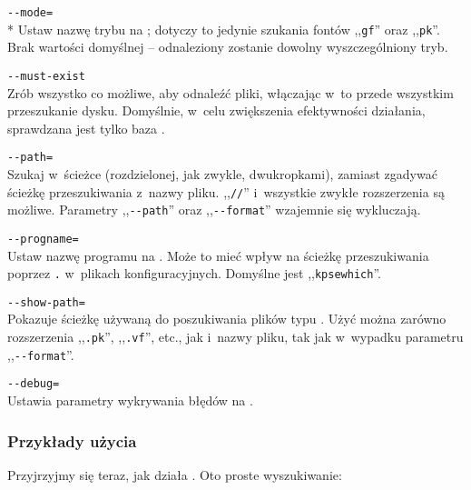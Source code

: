 \documentclass{article}
\renewcommand{\samp}[1]{,,\texttt{#1}''}  %
\begin{document}
\begin{ttdescription}
\item[\texttt{-{}-mode=\var{string}}]\mbox{}\\*
  Ustaw nazwę trybu na ; dotyczy to jedynie szukania
  fontów \samp{gf} oraz \samp{pk}.
  Brak wartości domyślnej --  odnaleziony zostanie dowolny
  wyszczególniony tryb.
\item[\texttt{-{}-must-exist}]\mbox{}\\
  Zrób wszystko co możliwe, aby odnaleźć pliki, włączając w~to przede wszystkim
  przeszukanie dysku.
  Domyślnie, w~celu zwiększenia efektywności działania, sprawdzana jest
  tylko baza .
\item[\texttt{-{}-path=\var{string}}]\mbox{}\\
  Szukaj w~ścieżce   (rozdzielonej, jak
  zwykle, dwukropkami), zamiast zgadywać ścieżkę przeszukiwania z~nazwy
  pliku. \samp{//} i~wszystkie zwykłe rozszerzenia są możliwe.
  Parametry \samp{-{}-path} oraz \samp{-{}-format} wzajemnie się  wykluczają.
\item[\texttt{-{}-progname=\var{nazwa}}]\mbox{}\\
  Ustaw nazwę programu na  .
  Może to mieć wpływ na ścieżkę przeszukiwania poprzez
  \texttt{.} w~plikach konfiguracyjnych.
  Domyślne jest \samp{kpsewhich}.
\item[\texttt{-{}-show-path=\var{nazwa}}]\mbox{}\\
  Pokazuje ścieżkę używaną do poszukiwania plików typu
   .
  Użyć można zarówno rozszerzenia \samp{.pk}, \samp{.vf}, etc., jak
  i~nazwy pliku, tak jak w~wypadku parametru \samp{-{}-format}.
\item[\texttt{-{}-debug=\var{num}}]\mbox{}\\
  Ustawia parametry wykrywania błędów na  .
\end{ttdescription}

\subsubsection{Przykłady użycia}
\label{sec:examples-of-use}

Przyjrzyjmy się teraz, jak działa \KPS{}. Oto proste wyszukiwanie:
\end{document}
